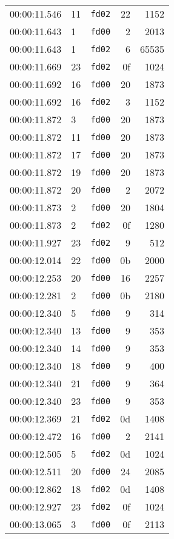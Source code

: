 \documentclass{article}
\begin{document}
\begin{longtable}{lllrr}
00:00:11.546 & 11 & \texttt{fd02} & 22 & 1152 \\
00:00:11.643 & 1 & \texttt{fd00} & 2 & 2013 \\
00:00:11.643 & 1 & \texttt{fd02} & 6 & 65535 \\
00:00:11.669 & 23 & \texttt{fd02} & 0f & 1024 \\
00:00:11.692 & 16 & \texttt{fd00} & 20 & 1873 \\
00:00:11.692 & 16 & \texttt{fd02} & 3 & 1152 \\
00:00:11.872 & 3 & \texttt{fd00} & 20 & 1873 \\
00:00:11.872 & 11 & \texttt{fd00} & 20 & 1873 \\
00:00:11.872 & 17 & \texttt{fd00} & 20 & 1873 \\
00:00:11.872 & 19 & \texttt{fd00} & 20 & 1873 \\
00:00:11.872 & 20 & \texttt{fd00} & 2 & 2072 \\
00:00:11.873 & 2 & \texttt{fd00} & 20 & 1804 \\
00:00:11.873 & 2 & \texttt{fd02} & 0f & 1280 \\
00:00:11.927 & 23 & \texttt{fd02} & 9 & 512 \\
00:00:12.014 & 22 & \texttt{fd00} & 0b & 2000 \\
00:00:12.253 & 20 & \texttt{fd00} & 16 & 2257 \\
00:00:12.281 & 2 & \texttt{fd00} & 0b & 2180 \\
00:00:12.340 & 5 & \texttt{fd00} & 9 & 314 \\
00:00:12.340 & 13 & \texttt{fd00} & 9 & 353 \\
00:00:12.340 & 14 & \texttt{fd00} & 9 & 353 \\
00:00:12.340 & 18 & \texttt{fd00} & 9 & 400 \\
00:00:12.340 & 21 & \texttt{fd00} & 9 & 364 \\
00:00:12.340 & 23 & \texttt{fd00} & 9 & 353 \\
00:00:12.369 & 21 & \texttt{fd02} & 0d & 1408 \\
00:00:12.472 & 16 & \texttt{fd00} & 2 & 2141 \\
00:00:12.505 & 5 & \texttt{fd02} & 0d & 1024 \\
00:00:12.511 & 20 & \texttt{fd00} & 24 & 2085 \\
00:00:12.862 & 18 & \texttt{fd02} & 0d & 1408 \\
00:00:12.927 & 23 & \texttt{fd02} & 0f & 1024 \\
00:00:13.065 & 3 & \texttt{fd00} & 0f & 2113 \\

\end{longtable}
\end{document}
